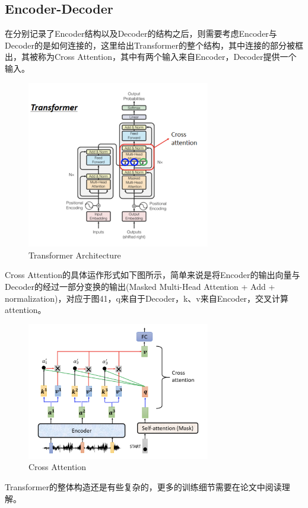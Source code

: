 \documentclass{article}
\begin{document}
\subsection{Encoder-Decoder}
\indent 在分别记录了Encoder结构以及Decoder的结构之后，则需要考虑Encoder与Decoder的是如何连接的，这里给出Transformer的整个结构，其中连接的部分被框出，其被称为Cross Attention，其中有两个输入来自Encoder，Decoder提供一个输入。 \par
\begin{figure}[H]
    \centering
    \includegraphics[width=8cm]{picture/Encoder-Decoder.png}
    \caption{Transformer Architecture}
    \label{fig:galxy}
\end{figure}
\indent Cross Attention的具体运作形式如下图所示，简单来说是将Encoder的输出向量与Decoder的经过一部分变换的输出(Masked Multi-Head Attention + Add + normalization)，对应于图41，q来自于Decoder，k、v来自Encoder，交叉计算attention。 \par
\begin{figure}[H]
    \centering
    \includegraphics[width=8cm]{picture/CrossAttention.png}
    \caption{Cross Attention}
    \label{fig:galxy}
\end{figure}
\indent Transformer的整体构造还是有些复杂的，更多的训练细节需要在论文中阅读理解。
\end{document}

